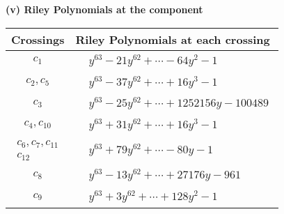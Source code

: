 \documentclass[1p]{elsarticle_modified}
\theoremstyle{definition}
\begin{document}
\newpage\renewcommand{\arraystretch}{1}
\flushleft \textbf{(v) Riley Polynomials at the component}\newline \\
\begin{tabular}{m{50pt}|m{274pt}}
Crossings & \hspace{64pt}Riley Polynomials at each crossing \\
\hline $$\begin{aligned}c_{1}\end{aligned}$$&$\begin{aligned}
&y^{63}-21 y^{62}+\cdots-64 y^2-1
\end{aligned}$\\
\hline $$\begin{aligned}c_{2},c_{5}\end{aligned}$$&$\begin{aligned}
&y^{63}-37 y^{62}+\cdots+16 y^3-1
\end{aligned}$\\
\hline $$\begin{aligned}c_{3}\end{aligned}$$&$\begin{aligned}
&y^{63}-25 y^{62}+\cdots+1252156 y-100489
\end{aligned}$\\
\hline $$\begin{aligned}c_{4},c_{10}\end{aligned}$$&$\begin{aligned}
&y^{63}+31 y^{62}+\cdots+16 y^3-1
\end{aligned}$\\
\hline $$\begin{aligned}c_{6},c_{7},c_{11}\\c_{12}\end{aligned}$$&$\begin{aligned}
&y^{63}+79 y^{62}+\cdots-80 y-1
\end{aligned}$\\
\hline $$\begin{aligned}c_{8}\end{aligned}$$&$\begin{aligned}
&y^{63}-13 y^{62}+\cdots+27176 y-961
\end{aligned}$\\
\hline $$\begin{aligned}c_{9}\end{aligned}$$&$\begin{aligned}
&y^{63}+3 y^{62}+\cdots+128 y^2-1
\end{aligned}$\\
\hline
\end{tabular}\\~\\
\end{document}
